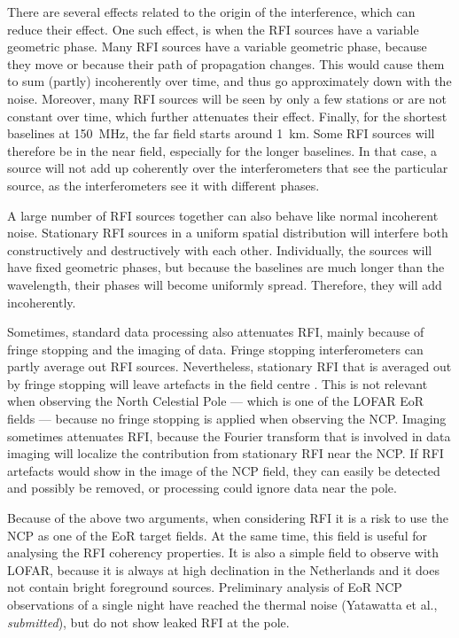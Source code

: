 \documentclass[useAMS,usenatbib]{mn2e}
\begin{document}
There are several effects related to the origin of the interference, which can reduce their effect. One such effect, is when the RFI sources have a variable geometric phase. Many RFI sources have a variable geometric phase, because they move or because their path of propagation changes. This would cause them to sum (partly) incoherently over time, and thus go approximately down with the noise. Moreover, many RFI sources will be seen by only a few stations or are not constant over time, which further attenuates their effect. Finally, for the shortest baselines at 150~MHz, the far field starts around 1~km. Some RFI sources will therefore be in the near field, especially for the longer baselines. In that case, a source will not add up coherently over the interferometers that see the particular source, as the interferometers see it with different phases.

A large number of RFI sources together can also behave like normal incoherent noise. Stationary RFI sources in a uniform spatial distribution will interfere both constructively and destructively with each other. Individually, the sources will have fixed geometric phases, but because the baselines are much longer than the wavelength, their phases will become uniformly spread. Therefore, they will add incoherently.

Sometimes, standard data processing also attenuates RFI, mainly because of fringe stopping and the imaging of data. Fringe stopping interferometers can partly average out RFI sources. Nevertheless, stationary RFI that is averaged out by fringe stopping will leave artefacts in the field centre \citep{post-correlation-filtering}. This is not relevant when observing the North Celestial Pole --- which is one of the LOFAR EoR fields --- because no fringe stopping is applied when observing the NCP. Imaging sometimes attenuates RFI, because the Fourier transform that is involved in data imaging will localize the contribution from stationary RFI near the NCP. If RFI artefacts would show in the image of the NCP field, they can easily be detected and possibly be removed, or processing could ignore data near the pole.

Because of the above two arguments, when considering RFI it is a risk to use the NCP as one of the EoR target fields. At the same time, this field is useful for analysing the RFI coherency properties. It is also a simple field to observe with LOFAR, because it is always at high declination in the Netherlands and it does not contain bright foreground sources. Preliminary analysis of EoR NCP observations of a single night have reached the thermal noise (Yatawatta et al., \textit{submitted}), but do not show leaked RFI at the pole.
\end{document}
